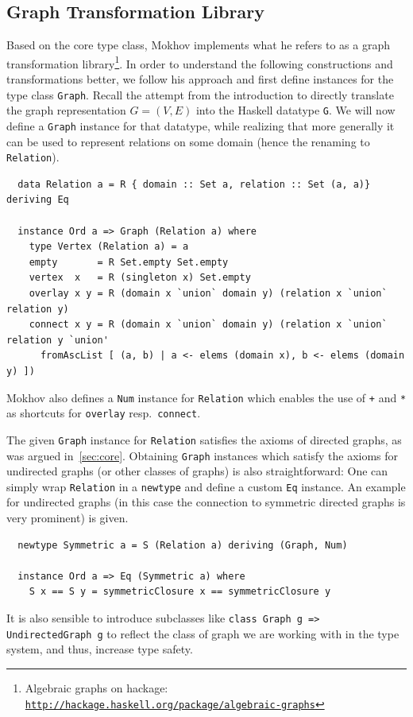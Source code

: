 \documentclass{article}
\newcommand{\hs}{\texttt}
\begin{document}
\subsection{Graph Transformation Library}\label{sec:trafo}
Based on the core type class, Mokhov implements what he refers to as a graph
transformation library\footnote{Algebraic graphs on hackage:
  \texttt{\href{http://hackage.haskell.org/package/algebraic-graphs}{http://hackage.haskell.org/package/algebraic-graphs}}}.
In order to understand the following constructions and transformations better,
we follow his approach and first define instances for the type class
\hs{Graph}. Recall the attempt from the introduction to directly translate the
graph representation $G=(V,E)$ into the Haskell datatype \hs{G}. We will now
define a \hs{Graph} instance for that datatype, while realizing that more
generally it can be used to represent relations on some domain (hence the renaming
to \hs{Relation}).
\begin{verbatim}
  data Relation a = R { domain :: Set a, relation :: Set (a, a)} deriving Eq

  instance Ord a => Graph (Relation a) where
    type Vertex (Relation a) = a
    empty       = R Set.empty Set.empty
    vertex  x   = R (singleton x) Set.empty
    overlay x y = R (domain x `union` domain y) (relation x `union` relation y)
    connect x y = R (domain x `union` domain y) (relation x `union` relation y `union'
      fromAscList [ (a, b) | a <- elems (domain x), b <- elems (domain y) ])
\end{verbatim}
Mokhov also defines a \hs{Num} instance for \hs{Relation} which enables the use
of \hs{+} and \hs{*} as shortcuts for \hs{overlay} resp.\ \hs{connect}.

The given \hs{Graph} instance for \hs{Relation} satisfies the axioms of directed
graphs, as was argued in~\autoref{sec:core}. Obtaining \hs{Graph} instances
which satisfy the axioms for undirected graphs (or other classes of graphs) is
also straightforward: One can simply wrap \hs{Relation} in a \hs{newtype} and
define a custom \hs{Eq} instance. An example for undirected graphs (in this case
the connection to symmetric directed graphs is very prominent) is given.
\begin{verbatim}
  newtype Symmetric a = S (Relation a) deriving (Graph, Num)

  instance Ord a => Eq (Symmetric a) where
    S x == S y = symmetricClosure x == symmetricClosure y
\end{verbatim}
It is also sensible to introduce subclasses like \hs{class Graph g => UndirectedGraph g}
to reflect the class of graph we are working with in the type system, and thus,
increase type safety.
\end{document}
